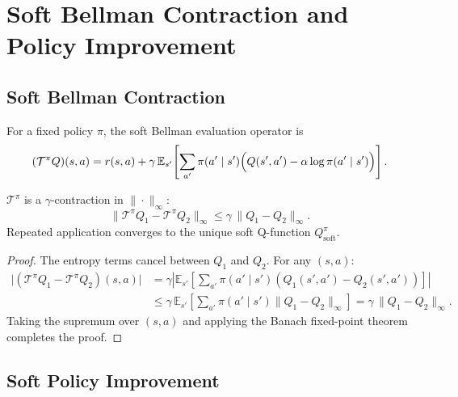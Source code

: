 \section{Soft Bellman Contraction and Policy Improvement}
\label{sec:Appendix_convergence}

\subsection{Soft Bellman Contraction}
\label{sec:Appendix_bellman_contraction}

For a fixed policy $\pi$, the soft Bellman evaluation operator is
\begin{equation}
  (\mathcal{T}^\pi Q)(s,a)
  = r(s,a) + \gamma\,\mathbb{E}_{s'}\!\left[
    \sum_{a'}\pi(a'\mid s')\Bigl(Q(s',a') - \alpha\log\pi(a'\mid s')\Bigr)\right].
\end{equation}

\begin{theorem}
\label{thm:bellman_contraction}
$\mathcal{T}^\pi$ is a $\gamma$-contraction in $\|\cdot\|_\infty$:
\begin{equation}
  \|\mathcal{T}^\pi Q_1 - \mathcal{T}^\pi Q_2\|_\infty \leq \gamma\,\|Q_1-Q_2\|_\infty.
\end{equation}
Repeated application converges to the unique soft Q-function $Q^\pi_{\mathrm{soft}}$.
\end{theorem}
\begin{proof}
The entropy terms cancel between $Q_1$ and $Q_2$. For any $(s,a)$:
\begin{align*}
  \bigl|(\mathcal{T}^\pi Q_1 - \mathcal{T}^\pi Q_2)(s,a)\bigr|
  &= \gamma\left|\mathbb{E}_{s'}\!\left[\sum_{a'}\pi(a'\mid s')
     (Q_1(s',a')-Q_2(s',a'))\right]\right| \\
  &\leq \gamma\,\mathbb{E}_{s'}\!\left[\sum_{a'}\pi(a'\mid s')\|Q_1-Q_2\|_\infty\right]
   = \gamma\,\|Q_1-Q_2\|_\infty.
\end{align*}
Taking the supremum over $(s,a)$ and applying the Banach fixed-point theorem completes the proof.
\end{proof}

\subsection{Soft Policy Improvement}
\label{sec:Appendix_policy_improvement}

